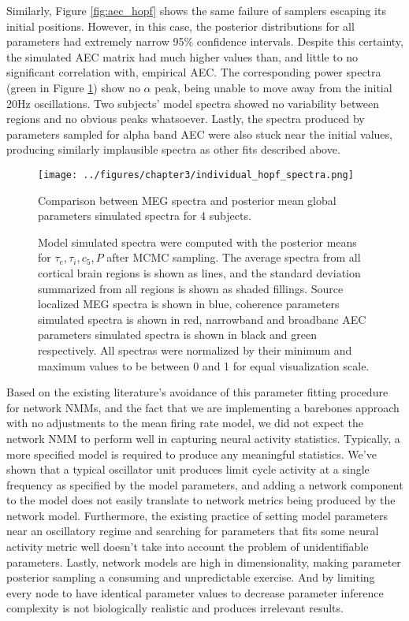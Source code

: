 Similarly, Figure \ref{fig:aec_hopf} shows the same failure of samplers escaping its initial positions. However, in this case, the posterior distributions for all parameters had extremely narrow 95\% confidence intervals. Despite this certainty, the simulated AEC matrix had much higher values than, and little to no significant correlation with, empirical AEC. The corresponding power spectra (green in Figure \ref{fig:psd_hopf}) show no $\alpha$ peak, being unable to move away from the initial 20Hz oscillations. Two subjects' model spectra showed no variability between regions and no obvious peaks whatsoever. Lastly, the spectra produced by parameters sampled for alpha band AEC were also stuck near the initial values, producing similarly implausible spectra as other fits described above. 

\begin{figure}[htbp]
    \centering
    \captionsetup{justification=centerlast}
    \texttt{[image: ../figures/chapter3/individual\_hopf\_spectra.png]}
   \caption{Comparison between MEG spectra and posterior mean global parameters simulated spectra for 4 subjects.}
    \caption*{Model simulated spectra were computed with the posterior means for ${\tau_e, \tau_i, c_5, P}$ after MCMC sampling. The average spectra from all cortical brain regions is shown as lines, and the standard deviation summarized from all regions is shown as shaded fillings. Source localized MEG spectra is shown in blue, coherence parameters simulated spectra is shown in red, narrowband and broadbanc AEC parameters simulated spectra is shown in black and green respectively. All spectras were normalized by their minimum and maximum values to be between 0 and 1 for equal visualization scale.}
    \label{fig:psd_hopf}
\end{figure}

Based on the existing literature's avoidance of this parameter fitting procedure for network NMMs, and the fact that we are implementing a barebones approach with no adjustments to the mean firing rate model, we did not expect the network NMM to perform well in capturing neural activity statistics. Typically, a more specified model is required to produce any meaningful statistics. We've shown that a typical oscillator unit produces limit cycle activity at a single frequency as specified by the model parameters, and adding a network component to the model does not easily translate to network metrics being produced by the network model. Furthermore, the existing practice of setting model parameters near an oscillatory regime and searching for parameters that fits some neural activity metric well doesn't take into account the problem of unidentifiable parameters. Lastly, network models are high in dimensionality, making parameter posterior sampling a consuming and unpredictable exercise. And by limiting every node to have identical parameter values to decrease parameter inference complexity is not biologically realistic and produces irrelevant results. 

